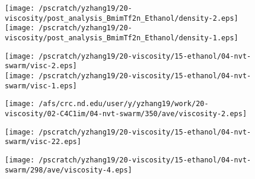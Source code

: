 \documentclass[12pt]{article}
\begin{document}
\newpage
\clearpage
\begin{figure}
\begin{center}
\texttt{[image: /pscratch/yzhang19/20-viscosity/post\_analysis\_BmimTf2n\_Ethanol/density-2.eps]}
\\
\texttt{[image: /pscratch/yzhang19/20-viscosity/post\_analysis\_BmimTf2n\_Ethanol/density-1.eps]}
\caption{}
\label{fig:density}
\end{center}
\end{figure}


\newpage
\clearpage
\begin{figure}
\begin{center}
\texttt{[image: /pscratch/yzhang19/20-viscosity/15-ethanol/04-nvt-swarm/visc-2.eps]}
\\
\texttt{[image: /pscratch/yzhang19/20-viscosity/15-ethanol/04-nvt-swarm/visc-1.eps]}
\caption{}
\label{fig:ethanol-ave}
\end{center}
\end{figure}

\newpage
\clearpage
\begin{figure}
\begin{center}
\texttt{[image: /afs/crc.nd.edu/user/y/yzhang19/work/20-viscosity/02-C4C1im/04-nvt-swarm/350/ave/viscosity-2.eps]}
\caption{}
\label{fig:t2weight}
\end{center}
\end{figure}


\newpage
\clearpage
\begin{figure}
\begin{center}
\texttt{[image: /pscratch/yzhang19/20-viscosity/15-ethanol/04-nvt-swarm/visc-22.eps]}
\caption{}
\label{fig:ethanol-2ps}
\end{center}
\end{figure}


\newpage
\clearpage
\begin{figure}
\begin{center}
\texttt{[image: /pscratch/yzhang19/20-viscosity/15-ethanol/04-nvt-swarm/298/ave/viscosity-4.eps]}
\caption{}
\label{fig:ethanol-fit}
\end{center}
\end{figure}
\end{document}
